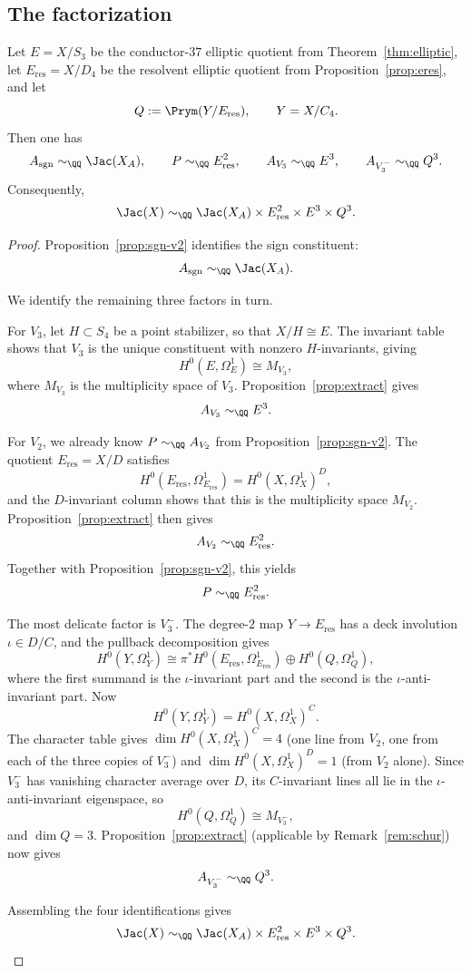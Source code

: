\subsection{The factorization}

\begin{theorem}\label{thm:full-factor}
Let \(E=X/S_3\) be the conductor-\(37\) elliptic quotient from Theorem~\ref{thm:elliptic}, let \(E_{\mathrm{res}}=X/D_4\) be the resolvent elliptic quotient from Proposition~\ref{prop:eres}, and let
\[
Q:=\Prym(Y/E_{\mathrm{res}}),\qquad Y=X/C_4.
\]
Then one has
\[
A_{\mathrm{sgn}}\sim_{\QQ}\Jac(X_A),\qquad
P\sim_{\QQ} E_{\mathrm{res}}^2,\qquad
A_{V_3}\sim_{\QQ} E^3,\qquad
A_{V_3^-}\sim_{\QQ} Q^3.
\]
Consequently,
\[
\Jac(X)\sim_{\QQ}\Jac(X_A)\times E_{\mathrm{res}}^2\times E^3\times Q^3.
\]
\end{theorem}

\begin{proof}
Proposition~\ref{prop:sgn-v2} identifies the sign constituent:
\[
A_{\mathrm{sgn}}\sim_{\QQ}\Jac(X_A).
\]

We identify the remaining three factors in turn.

For \(V_3\), let \(H\subset S_4\) be a point stabilizer, so that \(X/H\cong E\). The invariant table shows that \(V_3\) is the unique constituent with nonzero \(H\)-invariants, giving
\[
H^0(E,\Omega_E^1)\cong M_{V_3},
\]
where \(M_{V_3}\) is the multiplicity space of \(V_3\). Proposition~\ref{prop:extract} gives
\[
A_{V_3}\sim_{\QQ} E^3.
\]

For \(V_2\), we already know \(P\sim_{\QQ}A_{V_2}\) from Proposition~\ref{prop:sgn-v2}. The quotient \(E_{\mathrm{res}}=X/D\) satisfies
\[
H^0(E_{\mathrm{res}},\Omega_{E_{\mathrm{res}}}^1)=H^0(X,\Omega_X^1)^D,
\]
and the \(D\)-invariant column shows that this is the multiplicity space \(M_{V_2}\). Proposition~\ref{prop:extract} then gives
\[
A_{V_2}\sim_{\QQ} E_{\mathrm{res}}^2.
\]
Together with Proposition~\ref{prop:sgn-v2}, this yields
\[
P\sim_{\QQ}E_{\mathrm{res}}^2.
\]

The most delicate factor is \(V_3^-\). The degree-\(2\) map \(Y\to E_{\mathrm{res}}\) has a deck involution \(\iota\in D/C\), and the pullback decomposition gives
\[
H^0(Y,\Omega_Y^1)\cong \pi^*H^0(E_{\mathrm{res}},\Omega_{E_{\mathrm{res}}}^1)\oplus H^0(Q,\Omega_Q^1),
\]
where the first summand is the \(\iota\)-invariant part and the second is the \(\iota\)-anti-invariant part.
Now
\[
H^0(Y,\Omega_Y^1)=H^0(X,\Omega_X^1)^C.
\]
The character table gives \(\dim H^0(X,\Omega_X^1)^C=4\) (one line from \(V_2\), one from each of the three copies of \(V_3^-\)) and \(\dim H^0(X,\Omega_X^1)^D=1\) (from \(V_2\) alone). Since \(V_3^-\) has vanishing character average over \(D\), its \(C\)-invariant lines all lie in the \(\iota\)-anti-invariant eigenspace, so
\[
H^0(Q,\Omega_Q^1)\cong M_{V_3^-},
\]
and \(\dim Q=3\). Proposition~\ref{prop:extract} (applicable by Remark~\ref{rem:schur}) now gives
\[
A_{V_3^-}\sim_{\QQ} Q^3.
\]

Assembling the four identifications gives
\[
\Jac(X)\sim_{\QQ}\Jac(X_A)\times E_{\mathrm{res}}^2\times E^3\times Q^3.
\]
\end{proof}


